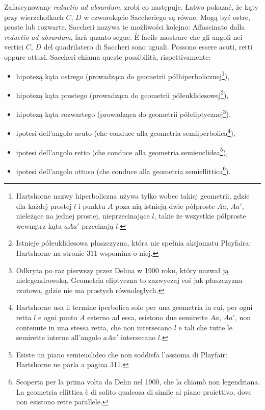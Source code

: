 Zafascynowany \emph{reductio ad absurdum}, zrobi co następuje. %
Łatwo pokazać, że kąty przy wierzchołkach $C$, $D$ w czworokącie Saccheriego są równe. %
Mogą być ostre, proste lub rozwarte. %
Saccheri nazywa te możliwości kolejno: %
Affascinato dalla \emph{reductio ad absurdum}, farà quanto segue. %
È facile mostrare che gli angoli nei vertici $C$, $D$ del quadrilatero di Saccheri sono uguali. %
Possono essere acuti, retti oppure ottusi. %
Saccheri chiama queste possibilità, rispettivamente: %
\begin{itemize}
	\item hipotezą kąta ostrego (prowadząca do geometrii półhiperbolicznej\footnote{Hartshorne nazwy hiperboliczna używa tylko wobec takiej geometrii, gdzie dla każdej prostej $l$ i punktu $A$ poza nią istnieją dwie półproste $Aa$, $Aa'$, nieleżące na jednej prostej, nieprzecinające $l$, takie że wszystkie półproste wewnątrz kąta $aAa'$ przecinają $l$.}), %
	\item hipotezą kąta prostego (prowadząca do geometrii półeuklidesowej\footnote{Istnieje półeuklidesowa płaszczyzna, która nie spełnia aksjomatu Playfaira: Hartshorne na stronie 311 wspomina o niej.}), %
	\item hipotezą kąta rozwartego (prowadząca do geometrii półeliptycznej\footnote{Odkryta po raz pierwszy przez Dehna w 1900 roku, który nazwał ją nielegendrowską. Geometria eliptyczna to zazwyczaj coś jak płaszczyzna rzutowa, gdzie nie ma prostych równoległych.}). %
	\item ipotesi dell'angolo acuto (che conduce alla geometria semiiperbolica\footnote{Hartshorne usa il termine iperbolica solo per una geometria in cui, per ogni retta $l$ e ogni punto $A$ esterno ad essa, esistono due semirette $Aa$, $Aa'$, non contenute in una stessa retta, che non intersecano $l$ e tali che tutte le semirette interne all'angolo $aAa'$ intersecano $l$.}), %
	\item ipotesi dell'angolo retto (che conduce alla geometria semieuclidea\footnote{Esiste un piano semieuclideo che non soddisfa l'assioma di Playfair: Hartshorne ne parla a pagina 311.}), %
	\item ipotesi dell'angolo ottuso (che conduce alla geometria semiellittica\footnote{Scoperta per la prima volta da Dehn nel 1900, che la chiamò non legendriana. La geometria ellittica è di solito qualcosa di simile al piano proiettivo, dove non esistono rette parallele.}). %
\end{itemize}

